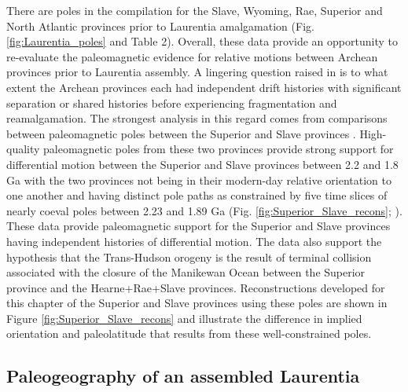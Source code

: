 \documentclass[twocolumn, switch]{article} %
\begin{document}
There are poles in the compilation for the Slave, Wyoming, Rae, Superior and North Atlantic provinces prior to Laurentia amalgamation (Fig. \ref{fig:Laurentia_poles} and Table 2). Overall, these data provide an opportunity to re-evaluate the paleomagnetic evidence for relative motions between Archean provinces prior to Laurentia assembly. A lingering question raised in \citet{Hoffman1988a} is to what extent the Archean provinces each had independent drift histories with significant separation or shared histories before experiencing fragmentation and reamalgamation. The strongest analysis in this regard comes from comparisons between paleomagnetic poles between the Superior and Slave provinces \citep{Buchan2009a, Mitchell2014a, Buchan2016a}. High-quality paleomagnetic poles from these two provinces provide strong support for differential motion between the Superior and Slave provinces between 2.2 and 1.8 Ga with the two provinces not being in their modern-day relative orientation to one another and having distinct pole paths as constrained by five time slices of nearly coeval poles between 2.23 and 1.89 Ga (Fig. \ref{fig:Superior_Slave_recons}; \citealp{Buchan2016a}). These data provide paleomagnetic support for the Superior and Slave provinces having independent histories of differential motion. The data also support the hypothesis that the Trans-Hudson orogeny is the result of terminal collision associated with the closure of the Manikewan Ocean between the Superior province and the Hearne+Rae+Slave provinces. Reconstructions developed for this chapter of the Superior and Slave provinces using these poles are shown in Figure \ref{fig:Superior_Slave_recons} and illustrate the difference in implied orientation and paleolatitude that results from these well-constrained poles.

\subsection{Paleogeography of an assembled Laurentia}
\end{document}
